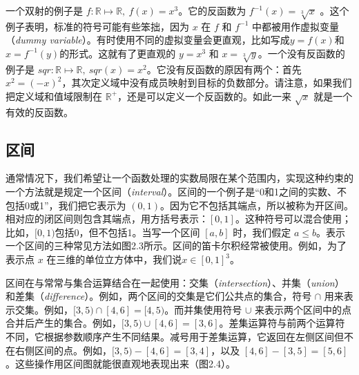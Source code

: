 
一个双射的例子是 $f : \mathbb{R} \mapsto \mathbb{R},\ f(x) = x^3$。它的反函数为 $f^{-1}(x) = \sqrt[3]{x}$ 。这个例子表明，标准的符号可能有些笨拙，因为 $x$ 在 $f$ 和 $f^{-1}$ 中都被用作虚拟变量（\textit{dummy variable}）。有时使用不同的虚拟变量会更直观，比如写成$y = f(x)$和$x=f^{-1}(y)$的形式。这就有了更直观的 $y = x^3$ 和 $x = \sqrt[3]{y}$。一个没有反函数的例子是 $sqr : \mathbb{R} \mapsto \mathbb{R},\ sqr(x) = x^2$。它没有反函数的原因有两个：首先 $x^2 = (-x)^2$，其次定义域中没有成员映射到目标的负数部分。请注意，如果我们把定义域和值域限制在 $\mathbb{R^+}$，还是可以定义一个反函数的。如此一来 $\sqrt{x}$ 就是一个有效的反函数。

\subsection{区间}

通常情况下，我们希望让一个函数处理的实数局限在某个范围内，实现这种约束的一个方法就是规定一个区间（\textit{interval}）。区间的一个例子是“0和1之间的实数、不包括0或1”，我们把它表示为 $(0,1)$。因为它不包括其端点，所以被称为开区间。相对应的闭区间则包含其端点，用方括号表示：$[0,1]$。这种符号可以混合使用；比如，$[0,1)$包括0，但不包括1。当写一个区间 $[a,b]$ 时，我们假定 $a \leq b$。表示一个区间的三种常见方法如图2.3所示。区间的笛卡尔积经常被使用。例如，为了表示点 $x$ 在三维的单位立方体中，我们说$x \in [0, 1]^3$。


区间在与常常与集合运算结合在一起使用：交集（\textit{intersection}）、并集（\textit{union}）和差集（\textit{difference}）。例如，两个区间的交集是它们公共点的集合，符号 $\cap$ 用来表示交集。例如，$[3,5) \cap [4,6] = [4,5)$。而并集使用符号 $\cup$ 来表示两个区间中的点合并后产生的集合。例如，$[3,5) \cup [4,6] = [3,6]$。差集运算符与前两个运算符不同，它根据参数顺序产生不同结果。减号用于差集运算，它返回在左侧区间但不在右侧区间的点。例如，$[3,5) - [4,6] = [3,4]$，以及 $[4,6] - [3,5] = [5,6]$。这些操作用区间图就能很直观地表现出来（图2.4）。

